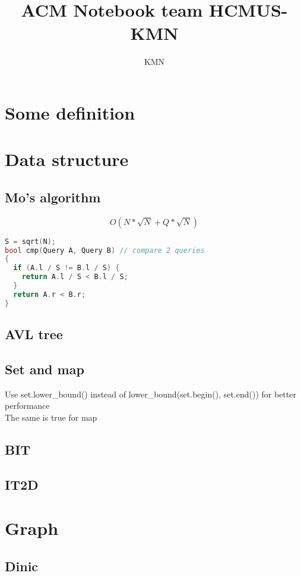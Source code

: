 \documentclass[A4 paper, 12pt, oneside]{article}
\title{ACM Notebook team HCMUS-KMN}
\author{KMN}
\begin{document}
	\begin{multicols}{2}
	\tableofcontents
	\small
	
\section{Some definition}
	

\section{Data structure}
	\subsection{Mo's algorithm}
\[O(N * \sqrt{N} + Q * \sqrt{N}) \]
	\begin{lstlisting}[language=C++]
S = sqrt(N);
bool cmp(Query A, Query B) // compare 2 queries
{
  if (A.l / S != B.l / S) {
    return A.l / S < B.l / S;
  }
  return A.r < B.r;
}
\end{lstlisting}

	\subsection{AVL tree}
	
	
	\subsection{Set and map}
	Use set.lower_bound() instead of lower_bound(set.begin(), set.end()) for better performance \\
	The same is true for map
	
	\subsection{BIT}
	
	
	\subsection{IT2D}
	

\section{Graph}
	\subsection{Dinic}
	


\end{multicols}
\end{document}
